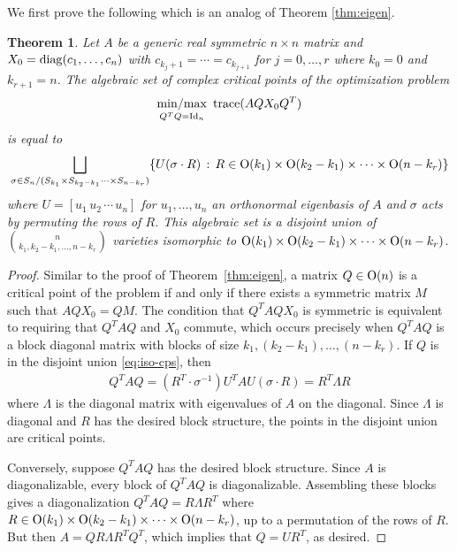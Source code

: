 \documentclass[12pt]{extarticle}
\newtheorem{theorem}{Theorem}
\theoremstyle{definition}
\numberwithin{theorem}{section}
\newcommand{\minmax}{\mathop{{\rm min/max}}}
\begin{document}
We first prove the following which is an analog of Theorem \ref{thm:eigen}. 
\begin{theorem} \label{thm:eigen-iso-impl} 
    Let $A$ be a generic real symmetric $n \times n$ matrix and $X_0 = {\rm diag}(c_1, \ldots, c_n)$ with $c_{k_j+1} = \cdots = c_{k_{j+1}}$ for $j=0, \ldots, r$ where $k_0=0$ and $k_{r+1} = n$.
    The algebraic set of complex critical points of the optimization problem
    \begin{align} \label{eq:eigen-iso-param}
        \minmax_{Q^TQ = {\rm Id}_n }\,\, {\rm trace}(A QX_0Q^T)
    \end{align}
    is equal to 
    \begin{align}\label{eq:iso-cps}
     \bigsqcup_{\sigma \in  S_n/(S_{k_1} \times S_{k_2-k_1} \cdots \times S_{n-k_r})}
     \{ U(\sigma \cdot R) \, : \, R \in  {\rm O}(k_1) \times {\rm O}(k_2-k_1) \times \cdots \times {\rm O}(n - k_{r})\} 
     \end{align}
    where $U = [u_1 \, u_2 \, \cdots \, u_n]$ for $u_1, \ldots, u_n$ an orthonormal eigenbasis of $A$ and $\sigma$ acts by permuting the rows of $R$. This algebraic set is a disjoint union of 
    $\binom{n}{k_1, k_2-k_1, \ldots, n-k_r}$ 
    varieties isomorphic to 
    $ {\rm O}(k_1) \times {\rm O}(k_2-k_1) \times \cdots \times {\rm O}(n - k_{r}) $. 
\end{theorem}
\begin{proof}
  Similar to the proof of Theorem~\ref{thm:eigen}, a matrix $Q \in {\rm O}(n)$ is a critical point of the problem if and only if there exists a symmetric matrix $M$ such that $AQX_0 = QM$.
  The condition that $Q^TAQX_0$ is symmetric is equivalent to requiring that $Q^TAQ$ and $X_0$ commute, which occurs precisely when $Q^TAQ$ is a block diagonal matrix with blocks of size $k_1,(k_2-k_1), \ldots, (n-k_r)$.
 If $Q$ is in the disjoint union \eqref{eq:iso-cps}, then 
    \begin{align*}
       Q^T AQ = (R^T \cdot \sigma^{-1})U^T AU (\sigma \cdot R) = R^T \Lambda R
    \end{align*}
    where $\Lambda$ is the diagonal matrix with eigenvalues of $A$ on the diagonal. 
    Since $\Lambda$ is diagonal and $R$ has the desired block structure, the points in the disjoint union are critical points.

    Conversely, suppose $Q^TAQ$ has the desired block structure. 
    Since $A$ is diagonalizable, every block of $Q^T A Q$ is diagonalizable.
    Assembling these blocks gives a diagonalization $Q^T AQ = R \Lambda R^T$ where $R \in  {\rm O}(k_1) \times {\rm O}(k_2-k_1) \times   \cdots \times {\rm O}(n-k_r)$, up to a permutation of the rows of $R$.
    But then $A = QR \Lambda R^TQ^T$, which implies that $Q = UR^T$, as desired.    
\end{proof}
\end{document}
